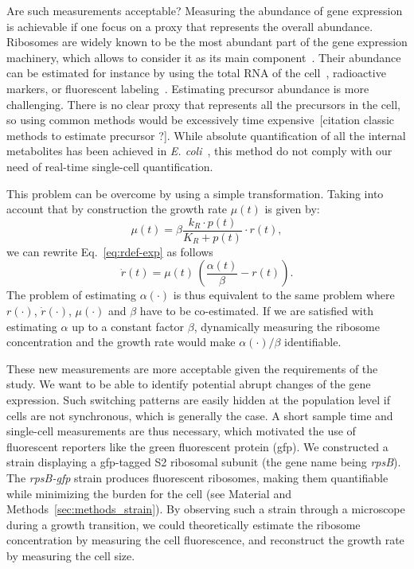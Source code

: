 Are such measurements acceptable?
Measuring the abundance of gene expression is achievable if one focus on a proxy that represents the overall abundance.
Ribosomes are widely known to be the most abundant part of the gene expression machinery, which allows to consider it as its main component~\cite{scott_interdependence_2010, scott_bacterial_2011,scott_emergence_2014}.
Their abundance can be estimated for instance by using the total RNA of the cell~\cite{scott_interdependence_2010}, radioactive markers\cite{gausing_regulation_1980,zengel_transcription_1986}, or fluorescent labeling~\cite{bakshi_superresolution_2012}.
Estimating precursor abundance is more challenging.
There is no clear proxy that represents all the precursors in the cell, so using common methods would be excessively time expensive~[citation classic methods to estimate precursor ?].
While absolute quantification of all the internal metabolites has been achieved in \textit{E. coli}~\cite{bennett_absolute_2009}, this method do not comply with our need of real-time single-cell quantification.

This problem can be overcome by using a simple transformation.
Taking into account that by construction the growth rate  $\mu(t)$ is given by:
\[
	\mu (t) = \beta \frac{k_R \cdot p(t)}{K_R + p(t)} \cdot r(t),
\]
we can rewrite Eq.~\ref{eq:rdef-exp} as follows
\begin{equation}
\label{eq:dot_r}
\dot{r}(t) = \mu (t) \, \left(\frac{\alpha(t)}{\beta} - r(t) \right).
\end{equation}
The problem of estimating $\alpha(\cdot)$ is thus equivalent to the same problem where $r(\cdot)$, $\dot{r}(\cdot)$, $\mu (\cdot)$ and $\beta$ have to be co-estimated.
If we are satisfied with estimating $\alpha$ up to a constant factor $\beta$, dynamically measuring the ribosome concentration and the growth rate would make $\alpha (\cdot) / \beta$ identifiable.

These new measurements are more acceptable given the requirements of the study.
We want to be able to identify potential abrupt changes of the gene expression.
Such switching patterns are easily hidden at the population level if cells are not synchronous, which is generally the case.
A short sample time and single-cell measurements are thus necessary, which motivated the use of fluorescent reporters like the green fluorescent protein (gfp).
We constructed a strain displaying a gfp-tagged S2 ribosomal subunit (the gene name being \textit{rpsB}).
The \textit{rpsB-gfp} strain produces fluorescent ribosomes, making them quantifiable while minimizing the burden for the cell (see Material and Methods~\ref{sec:methods_strain}).
By observing such a strain through a microscope during a growth transition, we could theoretically estimate the ribosome concentration by measuring the cell fluorescence, and reconstruct the growth rate by measuring the cell size.

